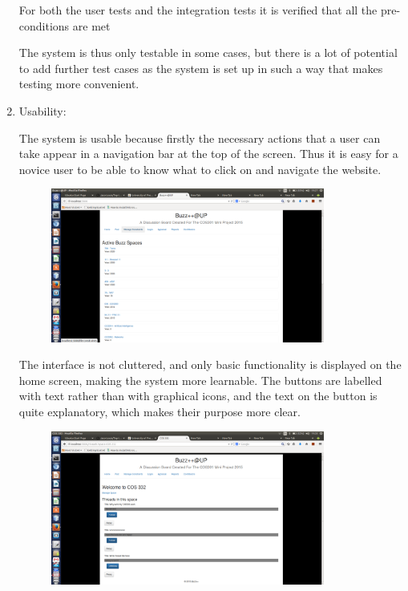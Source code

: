 \documentclass[hidelinks, 12pt, oneside]{article}
\begin{document}
\begin{enumerate}
For both the user tests and the integration tests it is verified that all the pre-conditions are met 

The system is thus only testable in some cases, but there is a lot of potential to add further test cases as the system is set up in such a way that makes testing more convenient.
 

\item Usability:

The system is usable because firstly the necessary actions that a user can take appear in a navigation bar at the top of the screen. Thus it is easy for a novice user to be able to know what to click on and navigate the website. 

\begin{figure}[h!]
  \centering
    \includegraphics[width=0.85\textwidth]{UsabilityScreenshotNavBar.png} 
\end{figure}

The interface is not cluttered, and only basic functionality is displayed on the home screen, making the system more learnable. The buttons are labelled with text rather than with graphical icons, and the text on the button is quite explanatory, which makes their purpose more clear. 

\begin{figure}[h!]
  \centering
    \includegraphics[width=0.85\textwidth]{UsabilityExplanatoryButtons} 
\end{figure}


\end{enumerate}
\end{document}
